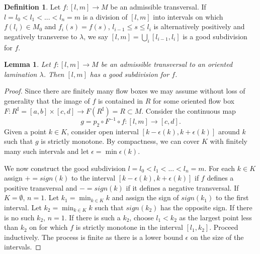 \documentclass{ip-journal}
\newtheorem{lemma}[theorem]{Lemma}
\theoremstyle{definition}
\newtheorem{definition}[theorem]{Definition}
\numberwithin{equation}{section}
\begin{document}
\begin{definition}\label{MDefinition12} Let $f:[l,m] \rightarrow M$ be an admissible transversal. If $l =l_0 <l_1 < ...< l_n = m$ is a division of $[l,m]$ into intervals on which $f(l_i) \in M_0$ and $f_i(s) = f(s)$, $l_{i-1}\leq s \leq l_i$ is alternatively positively and negatively transverse to $ \lambda$, we say $[l,m] = \bigcup_i [l_{i-1},l_i]$ is a good subdivision for $f$.
\end{definition}
\begin{lemma}\label{MLemma13}  Let $f: [l,m] \rightarrow M$ be an admissible transversal to an oriented lamination $ \lambda$. Then $[l,m]$ has a good subdivision for $f$.
\end{lemma}
\begin{proof} Since there are finitely  many flow boxes we may assume without loss of generality that the image of $f$ is contained in $R$ for some oriented flow box
$F: R^\sharp=[a,b] \times [c,d]  \rightarrow  F(R^\sharp) =R\subset M $. Consider the
continuous map
\[
g=p_2 \circ F^{-1} \circ f: [l, m] \rightarrow [c,d].
\]
Given a point $k \in K$, consider open interval $[k-\epsilon(k), k+\epsilon(k)]$ around $k$ such that $g$ is strictly monotone. By compactness, we can cover $K$ with finitely many such intervals and let $\epsilon=\min \epsilon(k)$.
  
We now construct the good subdivision $l =l_0 <l_1 < ...< l_n = m$. For each $k \in K$ assign  $+=sign(k)$ to the interval $[k-\epsilon(k), k+\epsilon(k)]$ if $f$ defines a positive transversal and $-=sign(k)$ if it defines a negative transversal.
 If $K =\emptyset$, $n = 1$. Let $k_1 = \min_{k \in K} k$ and assign the sign of $sign(k_1)$ to the first interval. Let $k_2 = \min_{k \in K} k$ such that $sign(k_2)$ has the opposite sign. If there is no such $k_2$, $n = 1$. If there is such a $k_2$, choose $l_1 < k_2$ as the largest point less than $k_2$ on for which $f$  is strictly monotone in the interval $[ l_1, k_2]$. Proceed inductively. The process is finite as there is a lower bound $\epsilon$ on the size of the intervals.
\end{proof}
\end{document}
